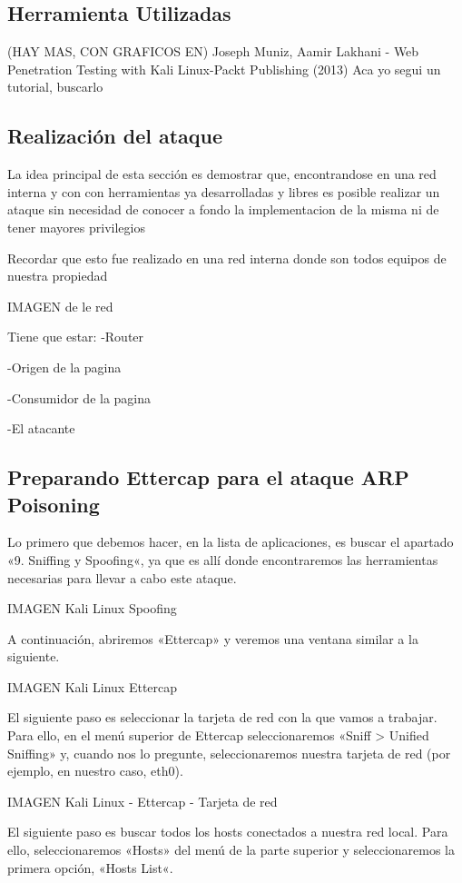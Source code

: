 
\subsection{Herramienta Utilizadas} 
    


(HAY MAS, CON GRAFICOS EN)
Joseph Muniz, Aamir Lakhani - Web Penetration Testing with Kali Linux-Packt Publishing (2013)
Aca yo segui un tutorial, buscarlo
\subsection{Realización del ataque}
La idea principal de esta sección es demostrar que, encontrandose en una red interna
y con con herramientas ya desarrolladas y libres es posible realizar un ataque 
sin necesidad de conocer a fondo la implementacion de la misma ni de tener mayores
privilegios

Recordar que esto fue realizado en una red interna donde son todos equipos de nuestra propiedad


IMAGEN de le red

Tiene que estar:
-Router

-Origen de la pagina

-Consumidor de la pagina

-El atacante

\subsection{Preparando Ettercap para el ataque ARP Poisoning}

Lo primero que debemos hacer, en la lista de aplicaciones, es buscar el apartado 
«9. Sniffing y Spoofing«, ya que es allí donde encontraremos las herramientas necesarias
 para llevar a cabo este ataque.

IMAGEN Kali Linux Spoofing

A continuación, abriremos «Ettercap» y veremos una ventana similar a la siguiente.

IMAGEN  Kali Linux Ettercap

El siguiente paso es seleccionar la tarjeta de red con la que vamos a trabajar. Para ello, en el menú superior de Ettercap seleccionaremos «Sniff > Unified Sniffing» y, cuando nos lo pregunte, seleccionaremos nuestra tarjeta de red (por ejemplo, en nuestro caso, eth0).

IMAGEN Kali Linux - Ettercap - Tarjeta de red

El siguiente paso es buscar todos los hosts conectados a nuestra red local. Para ello, seleccionaremos «Hosts» del menú de la parte superior y seleccionaremos la primera opción, «Hosts List«.

